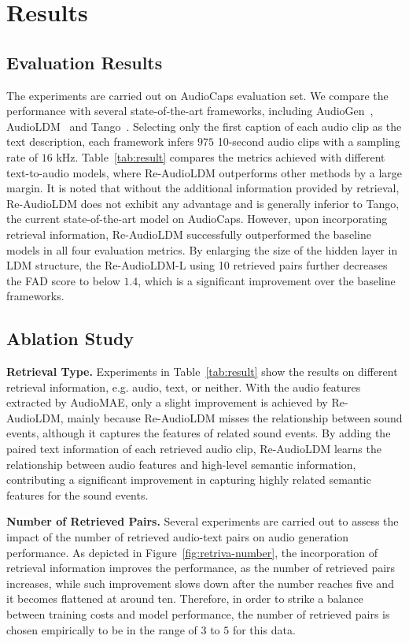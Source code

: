 \documentclass{article}
\begin{document}
\section{Results}
\label{sec:result}

\subsection{Evaluation Results}
The experiments are carried out on AudioCaps evaluation set. We compare the performance with several state-of-the-art frameworks, including AudioGen~\cite{audiogen}, AudioLDM~\cite{audioldm} and Tango~\cite{tango}. Selecting only the first caption of each audio clip as the text description, each framework infers $975$ 10-second audio clips with a sampling rate of $16$ kHz. Table~\ref{tab:result} compares the metrics achieved with different text-to-audio models, where Re-AudioLDM outperforms other methods by a large margin. It is noted that without the additional information provided by retrieval, Re-AudioLDM does not exhibit any advantage and is generally inferior to Tango, the current state-of-the-art model on AudioCaps. However, upon incorporating retrieval information, Re-AudioLDM successfully outperformed the baseline models in all four evaluation metrics. By enlarging the size of the hidden layer in LDM structure, the Re-AudioLDM-L using 10 retrieved pairs further decreases the FAD score to below $1.4$, which is a significant improvement over the baseline frameworks. 

\subsection{Ablation Study}
\label{ablation}
\textbf{Retrieval Type.}
Experiments in Table~\ref{tab:result} show the results on different retrieval information, e.g. audio, text, or neither. With the audio features extracted by AudioMAE, only a slight improvement is achieved by Re-AudioLDM, mainly because Re-AudioLDM misses the relationship between sound events, although it captures the features of related sound events. By adding the paired text information of each retrieved audio clip, Re-AudioLDM learns the relationship between audio features and high-level semantic information, contributing a significant improvement in capturing highly related semantic features for the sound events. 


\noindent
\textbf{Number of Retrieved Pairs.}
Several experiments are carried out to assess the impact of the number of retrieved audio-text pairs on audio generation performance. As depicted in Figure~\ref{fig:retriva-number}, the incorporation of retrieval information improves the performance, as the number of retrieved pairs increases, while such improvement slows down after the number reaches five and it becomes flattened at around ten. Therefore, in order to strike a balance between training costs and model performance, the number of retrieved pairs is chosen empirically to be in the range of $3$ to $5$ for this data.
\end{document}
